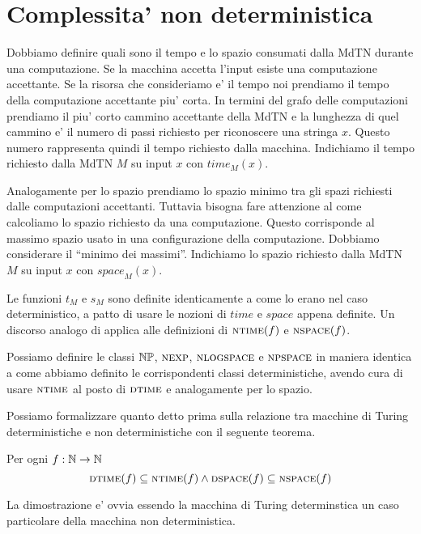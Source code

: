 \section{Complessita' non deterministica}

Dobbiamo definire quali sono il tempo e lo spazio consumati dalla MdTN durante una computazione. Se
la macchina accetta l'input esiste una computazione accettante. Se la risorsa che consideriamo e' il
tempo noi prendiamo il tempo della computazione accettante piu' corta. In termini del grafo delle
computazioni prendiamo il piu' corto cammino accettante della MdTN e la lunghezza di quel cammino e'
il numero di passi richiesto per riconoscere una stringa $x$. Questo numero rappresenta quindi il
tempo richiesto dalla macchina. Indichiamo il tempo richiesto dalla MdTN $M$ su input $x$ con
$\textit{time}_{M}(x)$.

Analogamente per lo spazio prendiamo lo spazio minimo tra gli spazi richiesti dalle computazioni
accettanti. Tuttavia bisogna fare attenzione al come calcoliamo lo spazio richiesto da una
computazione. Questo corrisponde al massimo spazio usato in una configurazione della computazione.
Dobbiamo considerare il ``minimo dei massimi''. Indichiamo lo spazio richiesto dalla MdTN $M$ su
input $x$ con $\textit{space}_{M}(x)$.

Le funzioni $t_{M}$ e $s_{M}$ sono definite identicamente a come lo erano nel caso deterministico, a
patto di usare le nozioni di $\textit{time}$ e $\textit{space}$ appena definite. Un discorso analogo
di applica alle definizioni di $\textsc{ntime}(f)$ e $\textsc{nspace}(f)$.

Possiamo definire le classi $\mathbb{NP}$, $\textsc{nexp}$, $\textsc{nlogspace}$ e $\textsc{npspace}$ in maniera identica a
come abbiamo definito le corrispondenti classi deterministiche, avendo cura di usare $\textsc{ntime}$ al
posto di $\textsc{dtime}$ e analogamente per lo spazio.

Possiamo formalizzare quanto detto prima sulla relazione tra macchine di Turing deterministiche e
non deterministiche con il seguente teorema.
\begin{thm}
    Per ogni $f: \mathbb{N} \to \mathbb{N}$
    \begin{equation*}
        \textsc{dtime}(f) \subseteq \textsc{ntime}(f) \land \textsc{dspace}(f) \subseteq \textsc{nspace}(f)
    \end{equation*}
\end{thm}
La dimostrazione e' ovvia essendo la macchina di Turing determinstica un caso particolare della
macchina non deterministica.


